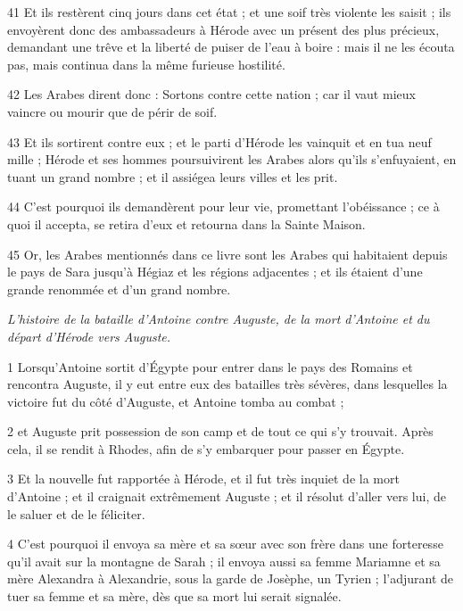 \par 41 Et ils restèrent cinq jours dans cet état ; et une soif très violente les saisit ; ils envoyèrent donc des ambassadeurs à Hérode avec un présent des plus précieux, demandant une trêve et la liberté de puiser de l'eau à boire : mais il ne les écouta pas, mais continua dans la même furieuse hostilité.

\par 42 Les Arabes dirent donc : Sortons contre cette nation ; car il vaut mieux vaincre ou mourir que de périr de soif.

\par 43 Et ils sortirent contre eux ; et le parti d'Hérode les vainquit et en tua neuf mille ; Hérode et ses hommes poursuivirent les Arabes alors qu'ils s'enfuyaient, en tuant un grand nombre ; et il assiégea leurs villes et les prit.

\par 44 C'est pourquoi ils demandèrent pour leur vie, promettant l'obéissance ; ce à quoi il accepta, se retira d'eux et retourna dans la Sainte Maison.

\par 45 Or, les Arabes mentionnés dans ce livre sont les Arabes qui habitaient depuis le pays de Sara jusqu'à Hégiaz et les régions adjacentes ; et ils étaient d'une grande renommée et d'un grand nombre.



\par \textit{L'histoire de la bataille d'Antoine contre Auguste, de la mort d'Antoine et du départ d'Hérode vers Auguste.}

\par 1 Lorsqu'Antoine sortit d'Égypte pour entrer dans le pays des Romains et rencontra Auguste, il y eut entre eux des batailles très sévères, dans lesquelles la victoire fut du côté d'Auguste, et Antoine tomba au combat ;

\par 2 et Auguste prit possession de son camp et de tout ce qui s'y trouvait. Après cela, il se rendit à Rhodes, afin de s'y embarquer pour passer en Égypte.

\par 3 Et la nouvelle fut rapportée à Hérode, et il fut très inquiet de la mort d'Antoine ; et il craignait extrêmement Auguste ; et il résolut d'aller vers lui, de le saluer et de le féliciter.

\par 4 C'est pourquoi il envoya sa mère et sa sœur avec son frère dans une forteresse qu'il avait sur la montagne de Sarah ; il envoya aussi sa femme Mariamne et sa mère Alexandra à Alexandrie, sous la garde de Josèphe, un Tyrien ; l'adjurant de tuer sa femme et sa mère, dès que sa mort lui serait signalée.

